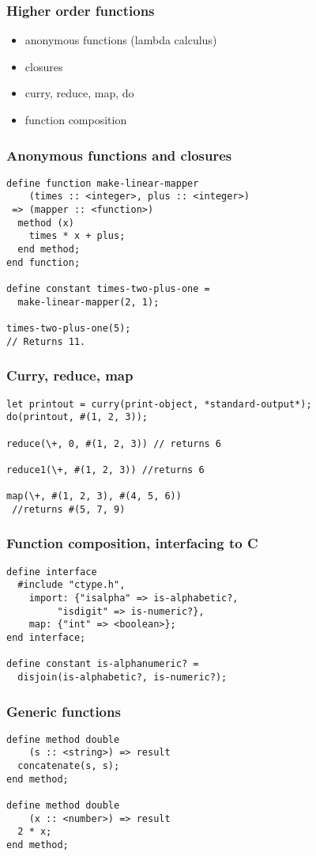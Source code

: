 \documentclass[compress]{beamer}
\begin{document}
\begin{frame}
  \frametitle{Higher order functions}
  \begin{itemize}
  \item anonymous functions (lambda calculus)
  \item closures
  \item curry, reduce, map, do
  \item function composition
  \end{itemize}
\end{frame}

\begin{frame}[fragile]
  \frametitle{Anonymous functions and closures}
  \begin{verbatim}
define function make-linear-mapper
    (times :: <integer>, plus :: <integer>)
 => (mapper :: <function>)
  method (x)
    times * x + plus;
  end method;
end function;

define constant times-two-plus-one =
  make-linear-mapper(2, 1);

times-two-plus-one(5);
// Returns 11.
  \end{verbatim}
\end{frame}

\begin{frame}[fragile]
  \frametitle{Curry, reduce, map}
  \begin{verbatim}
let printout = curry(print-object, *standard-output*);
do(printout, #(1, 2, 3));

reduce(\+, 0, #(1, 2, 3)) // returns 6

reduce1(\+, #(1, 2, 3)) //returns 6

map(\+, #(1, 2, 3), #(4, 5, 6))
 //returns #(5, 7, 9)
  \end{verbatim}
\end{frame}

\begin{frame}[fragile]
  \frametitle{Function composition, interfacing to C}
  \begin{verbatim}
define interface
  #include "ctype.h",
    import: {"isalpha" => is-alphabetic?,
	     "isdigit" => is-numeric?},
    map: {"int" => <boolean>};
end interface;

define constant is-alphanumeric? =
  disjoin(is-alphabetic?, is-numeric?);
  \end{verbatim}
\end{frame}

\begin{frame}[fragile]
  \frametitle{Generic functions}
  \begin{verbatim}
define method double
    (s :: <string>) => result
  concatenate(s, s);
end method;

define method double
    (x :: <number>) => result
  2 * x;
end method;
  \end{verbatim}
\end{frame}
\end{document}
